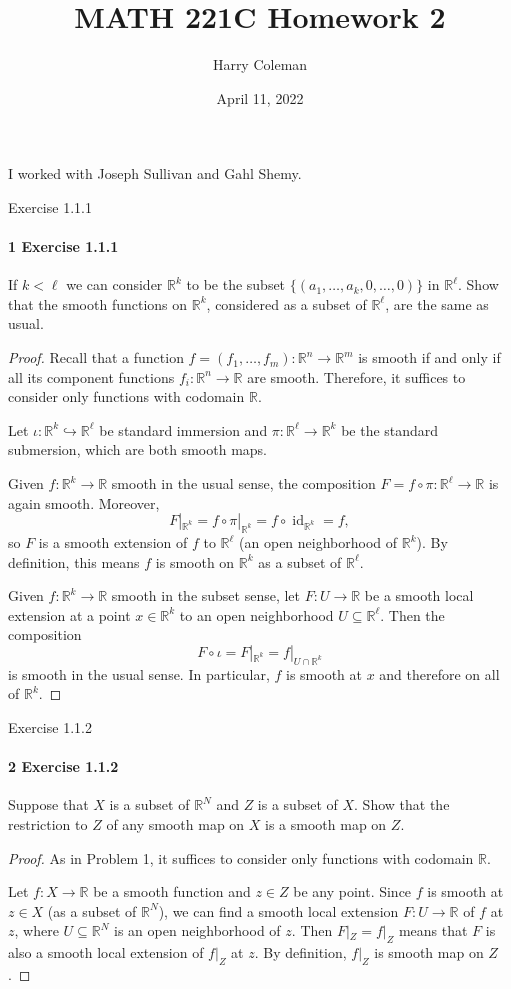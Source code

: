 \documentclass[12pt]{article}
\renewcommand{\maketitle}{\thispagestyle{title}}
\newlength{\myparskip}
\newenvironment{fullbox}{\begin{lrbox}{\savefullbox}\begin{minipage}{\dimexpr\textwidth-2\fboxsep\relax}\setlength{\parskip}{\myparskip}}{\end{minipage}\end{lrbox}\framebox[\textwidth]{\usebox{\savefullbox}}}
\newenvironment{pbox}[1][]{\begin{fullbox}\ifx#1\empty\else\paragraph{#1}\phantom{}\fi}{\end{fullbox}}
\theoremstyle{definition}
\newcommand{\R}{\mathbb{R}}
\newcommand{\<}{\langle}
\renewcommand{\>}{\rangle}
\newcommand{\seq}{\subseteq}
\DeclareMathOperator{\id}{id}
\newcommand{\inc}{\hookrightarrow}
\begin{document}
\title{MATH 221C Homework 2}
\author{Harry Coleman}
\date{April 11, 2022}
\maketitle

I worked with Joseph Sullivan and Gahl Shemy.

\begin{pbox}[1 Exercise 1.1.1]
    If $k < \ell$ we can consider $\R^k$ to be the subset $\{(a_1, \dots, a_k, 0, \dots, 0)\}$ in $\R^\ell$.
    Show that the smooth functions on $\R^k$, considered as a subset of $\R^\ell$, are the same as usual.
\end{pbox}

\begin{proof}
    Recall that a function $f = (f_1, \dots, f_m) : \R^n \to \R^m$ is smooth if and only if all its component functions $f_i : \R^n \to \R$ are smooth.
    Therefore, it suffices to consider only functions with codomain $\R$.
    
    Let $\iota : \R^k \inc \R^\ell$ be standard immersion and $\pi : \R^\ell \to \R^k$ be the standard submersion, which are both smooth maps.

    Given $f : \R^k \to \R$ smooth in the usual sense, the composition $F = f \circ \pi : \R^\ell \to \R$ is again smooth.
    Moreover,
    \[
        F|_{\R^k} = f \circ \pi|_{\R^k} = f \circ \id_{\R^k} = f,
    \]
    so $F$ is a smooth extension of $f$ to $\R^\ell$ (an open neighborhood of $\R^k$).
    By definition, this means $f$ is smooth on $\R^k$ as a subset of $\R^\ell$.

    Given $f : \R^k \to \R$ smooth in the subset sense, let $F : U \to \R$ be a smooth local extension at a point $x \in \R^k$ to an open neighborhood $U \seq \R^\ell$.
    Then the composition
    \[
        F \circ \iota = F|_{\R^k} = f|_{U \cap \R^k}
    \]
    is smooth in the usual sense.
    In particular, $f$ is smooth at $x$ and therefore on all of $\R^k$.
\end{proof}

\begin{pbox}[2 Exercise 1.1.2]
    Suppose that $X$ is a subset of $\R^N$ and $Z$ is a subset of $X$.
    Show that the restriction to $Z$ of any smooth map on $X$ is a smooth map on $Z$.
\end{pbox}

\begin{proof}
    As in Problem 1, it suffices to consider only functions with codomain $\R$.

    Let $f : X \to \R$ be a smooth function and $z \in Z$ be any point.
    Since $f$ is smooth at $z \in X$ (as a subset of $\R^N$), we can find a smooth local extension $F : U \to \R$ of $f$ at $z$, where $U \seq \R^N$ is an open neighborhood of $z$.
    Then $F|_Z = f|_Z$ means that $F$ is also a smooth local extension of $f|_Z$ at $z$.
    By definition, $f|_Z$ is smooth map on $Z$.
\end{proof}
\end{document}
